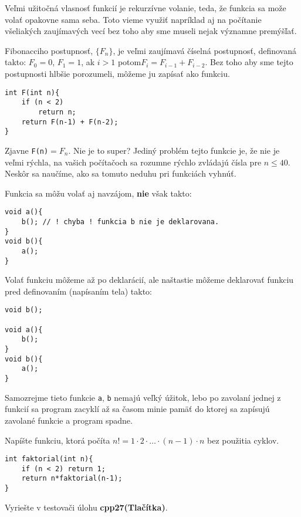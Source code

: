 \medskip

Veľmi užitočná vlasnosť funkcií je rekurzívne volanie, teda, že funkcia sa može
volať opakovne sama seba. Toto vieme využiť napríklad aj na počítanie
všeliakých zaujímavých vecí bez toho aby sme museli nejak významne
premýšľať.

Fibonacciho postupnosť, $\{F_n\}$,  je veľmi zaujímavá číselná postupnosť,
definovaná takto: $F_0 = 0$, $F_1 = 1$, ak $i>1$ potom$F_i = F_{i-1} +
F_{i-2}$.  Bez toho aby sme tejto postupnosti hlbšie porozumeli, môžeme ju
zapísať ako funkciu.

\begin{lstlisting}
int F(int n){
    if (n < 2)
        return n;
    return F(n-1) + F(n-2);
}
\end{lstlisting}

Zjavne \verb!F(n)!$ = F_n$. Nie je to super? Jediný problém tejto funkcie je,
že nie je veľmi rýchla, na vašich počítačoch sa rozumne rýchlo zvládajú čísla
pre $n \leq 40$. Neskôr sa naučíme, ako sa tomuto neduhu pri funkciách vyhnúť.

\medskip

Funkcia sa môžu volať aj navzájom, \textbf{nie} však takto:
\begin{lstlisting}
void a(){
    b(); // ! chyba ! funkcia b nie je deklarovana.
}
void b(){
    a();
}
\end{lstlisting}

Volať funkciu môžeme až po deklarácií, ale naštastie môžeme deklarovať
funkciu pred definovaním (napísaním tela) takto:

\begin{lstlisting}
void b();

void a(){
    b();
}
void b(){
    a();
}
\end{lstlisting}

Samozrejme tieto funkcie \verb!a!, \verb!b! nemajú veľký úžitok, lebo po
zavolaní jednej z funkcií sa program zacyklí až sa časom minie pamäť do ktorej
sa zapísujú zavolané funkcie a program spadne.

\cvicenie Napíšte funkciu, ktorá počíta $n! = 1\cdot 2\cdot\dots\cdot
(n-1)\cdot n$ bez použitia cyklov.

\riesenie 
{}\begin{lstlisting}
int faktorial(int n){
    if (n < 2) return 1;
    return n*faktorial(n-1);
}
\end{lstlisting}

Vyriešte v testovači úlohu \textbf{cpp27(Tlačítka)}.

